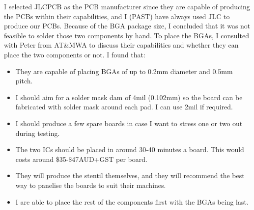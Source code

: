 I selected JLCPCB as the PCB manufacturer since they are capable of producing the PCBs within their capabilities, and I (PAST) have always used JLC to produce our PCBs.
\nl
Because of the BGA package size, I concluded that it was not feasible to solder those two components by hand. To place the BGAs, I consulted with Peter from AT\&MWA to discuss their capabilities and whether they can place the two components or not. I found that:
\begin{itemize}[noitemsep]
    \item They are capable of placing BGAs of up to 0.2mm diameter and 0.5mm pitch.
    \item I should aim for a solder mask dam of 4mil (0.102mm) so the board can be fabricated with solder mask around each pad. I can use 2mil if required.
    \item I should produce a few spare boards in case I want to stress one or two out during testing.
    \item The two ICs should be placed in around 30-40 minutes a board. This would costs around \$35-\$47AUD+GST per board.
    \item They will produce the stentil themselves, and they will recommend the best way to panelise the boards to suit their machines.
    \item I are able to place the rest of the components first with the BGAs being last.
\end{itemize}